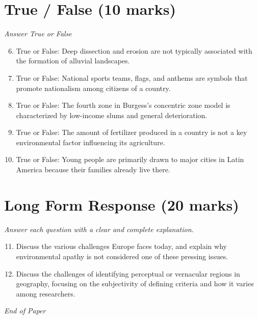 \documentclass[12pt]{article}
\begin{document}
\section*{True / False (10 marks)}
\textit{Answer True or False}
\begin{enumerate}[label=\arabic*.]
\setcounter{enumi}{5}
\item True or False: Deep dissection and erosion are not typically associated with the formation of alluvial landscapes.
\item True or False: National sports teams, flags, and anthems are symbols that promote nationalism among citizens of a country.
\item True or False: The fourth zone in Burgess's concentric zone model is characterized by low-income slums and general deterioration.
\item True or False: The amount of fertilizer produced in a country is not a key environmental factor influencing its agriculture.
\item True or False: Young people are primarily drawn to major cities in Latin America because their families already live there.
\end{enumerate}

\section*{Long Form Response (20 marks)}
\textit{Answer each question with a clear and complete explanation.}
\begin{enumerate}[label=\arabic*.]
\setcounter{enumi}{10}
\item Discuss the various challenges Europe faces today, and explain why environmental apathy is not considered one of these pressing issues.
\item Discuss the challenges of identifying perceptual or vernacular regions in geography, focusing on the subjectivity of defining criteria and how it varies among researchers.
\end{enumerate}

\vfill
\noindent\textit{End of Paper}
\end{document}
